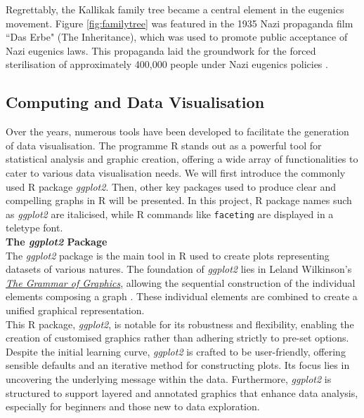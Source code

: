 \documentclass{article}\usepackage[]{graphicx}\usepackage[]{xcolor}
\numberwithin{equation}{section}
\begin{document}
\noindent
Regrettably, the Kallikak family tree became a central element in the eugenics movement. Figure \ref{fig:familytree} was featured in the 1935 Nazi propaganda film ``Das Erbe" (The Inheritance), which was used to promote public acceptance of Nazi eugenics laws. This propaganda laid the groundwork for the forced sterilisation of approximately 400,000 people under Nazi eugenics policies \cite{eugenics}.

\subsection{Computing and Data Visualisation}
\noindent
Over the years, numerous tools have been developed to facilitate the generation of data visualisation. The programme R stands out as a powerful tool for statistical analysis and graphic creation, offering a wide array of functionalities to cater to various data visualisation needs. We will first introduce the commonly used R package \textit{ggplot2}. Then, other key packages used to produce clear and compelling graphs in R will be presented. In this project, R package names such as \textit{ggplot2} are italicised, while R commands like \texttt{faceting} are displayed in a teletype font.\\

\noindent \textbf{The \textit{ggplot2} Package}\\
\noindent
The \textit{ggplot2} package is the main tool in R used to create plots representing datasets of various natures. The foundation of \textit{ggplot2} lies in Leland Wilkinson's \href{https://link.springer.com/chapter/10.1007/978-3-642-21551-3_13}{\textit{The Grammar of Graphics}}, allowing the sequential construction of the individual elements composing a graph \cite{wilkinson2012grammar}. These individual elements are combined to create a unified graphical representation.\\

\noindent
This R package, \textit{ggplot2}, is notable for its robustness and flexibility, enabling the creation of customised graphics rather than adhering strictly to pre-set options. Despite the initial learning curve, \textit{ggplot2} is crafted to be user-friendly, offering sensible defaults and an iterative method for constructing plots. Its focus lies in uncovering the underlying message within the data. Furthermore, \textit{ggplot2} is structured to support layered and annotated graphics that enhance data analysis, especially for beginners and those new to data exploration.\\
\end{document}
